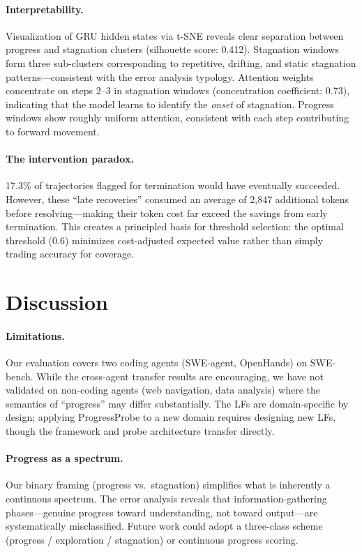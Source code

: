 \documentclass[11pt,a4paper]{article}
\begin{document}
\paragraph{Interpretability.}
Visualization of GRU hidden states via t-SNE reveals clear separation between progress and stagnation clusters (silhouette score: 0.412).
Stagnation windows form three sub-clusters corresponding to repetitive, drifting, and static stagnation patterns---consistent with the error analysis typology.
Attention weights concentrate on steps 2--3 in stagnation windows (concentration coefficient: 0.73), indicating that the model learns to identify the \emph{onset} of stagnation.
Progress windows show roughly uniform attention, consistent with each step contributing to forward movement.

\paragraph{The intervention paradox.}
17.3\% of trajectories flagged for termination would have eventually succeeded.
However, these ``late recoveries'' consumed an average of 2,847 additional tokens before resolving---making their token cost far exceed the savings from early termination.
This creates a principled basis for threshold selection: the optimal threshold (0.6) minimizes cost-adjusted expected value rather than simply trading accuracy for coverage.

\section{Discussion}

\paragraph{Limitations.}
Our evaluation covers two coding agents (SWE-agent, OpenHands) on SWE-bench.
While the cross-agent transfer results are encouraging, we have not validated on non-coding agents (web navigation, data analysis) where the semantics of ``progress'' may differ substantially.
The LFs are domain-specific by design; applying ProgressProbe to a new domain requires designing new LFs, though the framework and probe architecture transfer directly.

\paragraph{Progress as a spectrum.}
Our binary framing (progress vs.\ stagnation) simplifies what is inherently a continuous spectrum.
The error analysis reveals that information-gathering phases---genuine progress toward understanding, not toward output---are systematically misclassified.
Future work could adopt a three-class scheme (progress / exploration / stagnation) or continuous progress scoring.
\end{document}
